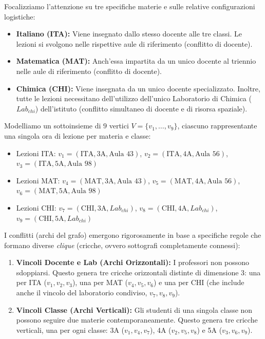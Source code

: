 Focalizziamo l'attenzione su tre specifiche materie e sulle relative
configurazioni logistiche:
\begin{itemize}
    \item \textbf{Italiano (ITA):} Viene insegnato dallo stesso docente alle tre
    classi. Le lezioni si svolgono nelle rispettive aule di riferimento
    (conflitto di docente).
    \item \textbf{Matematica (MAT):} Anch'essa impartita da un unico docente al
    triennio nelle aule di riferimento (conflitto di docente).
    \item \textbf{Chimica (CHI):} Viene insegnata da un unico docente
    specializzato. Inoltre, tutte le lezioni necessitano dell'utilizzo
    dell'unico Laboratorio di Chimica ($Lab_{chi}$) dell'istituto (conflitto
    simultaneo di docente e di risorsa spaziale).
\end{itemize}

Modelliamo un sottoinsieme di $9$ vertici $V = \{v_1, \dots, v_9\}$, ciascuno
rappresentante una singola ora di lezione per materia e classe:
\begin{itemize}
    \item Lezioni ITA: $v_1 = (\text{ITA}, \text{3A}, \text{Aula } 43)$, $v_2 =
    (\text{ITA}, \text{4A}, \text{Aula } 56)$, $v_3 = (\text{ITA}, \text{5A},
    \text{Aula } 98)$
    \item Lezioni MAT: $v_4 = (\text{MAT}, \text{3A}, \text{Aula } 43)$, $v_5 =
    (\text{MAT}, \text{4A}, \text{Aula } 56)$, $v_6 = (\text{MAT}, \text{5A},
    \text{Aula } 98)$
    \item Lezioni CHI: $v_7 = (\text{CHI}, \text{3A}, Lab_{chi})$, $v_8 =
    (\text{CHI}, \text{4A}, Lab_{chi})$, $v_9 = (\text{CHI}, \text{5A},
    Lab_{chi})$
\end{itemize}

I conflitti (archi del grafo) emergono rigorosamente in base a specifiche regole
che formano diverse \emph{clique} (cricche, ovvero sottografi completamente
connessi):

\begin{enumerate}
    \item \textbf{Vincoli Docente e Lab (Archi Orizzontali):} I professori non
    possono sdoppiarsi. Questo genera tre cricche orizzontali distinte di
    dimensione 3: una per ITA ($v_1, v_2, v_3$), una per MAT ($v_4, v_5, v_6$) e
    una per CHI (che include anche il vincolo del laboratorio condiviso, $v_7,
    v_8, v_9$).
    \item \textbf{Vincoli Classe (Archi Verticali):} Gli studenti di una singola
    classe non possono seguire due materie contemporaneamente. Questo genera tre
    cricche verticali, una per ogni classe: 3A ($v_1, v_4, v_7$), 4A ($v_2, v_5,
    v_8$) e 5A ($v_3, v_6, v_9$).
\end{enumerate}


